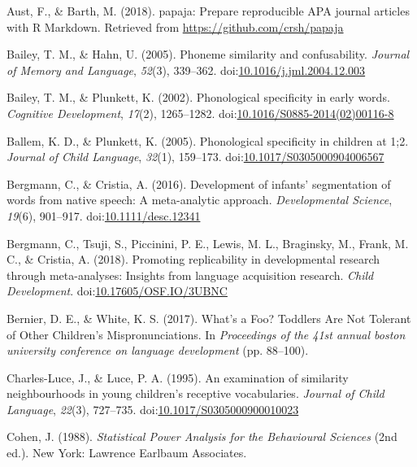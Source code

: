 \documentclass[man, noextraspace]{apa6}
\begin{document}
\leavevmode\hypertarget{ref-papaja}{}%
Aust, F., \& Barth, M. (2018). papaja: Prepare reproducible APA journal articles with R Markdown. Retrieved from \url{https://github.com/crsh/papaja}

\leavevmode\hypertarget{ref-Bailey2005}{}%
Bailey, T. M., \& Hahn, U. (2005). Phoneme similarity and confusability. \emph{Journal of Memory and Language}, \emph{52}(3), 339--362. doi:\href{https://doi.org/10.1016/j.jml.2004.12.003}{10.1016/j.jml.2004.12.003}

\leavevmode\hypertarget{ref-Bailey2002}{}%
Bailey, T. M., \& Plunkett, K. (2002). Phonological specificity in early words. \emph{Cognitive Development}, \emph{17}(2), 1265--1282. doi:\href{https://doi.org/10.1016/S0885-2014(02)00116-8}{10.1016/S0885-2014(02)00116-8}

\leavevmode\hypertarget{ref-Ballem2005}{}%
Ballem, K. D., \& Plunkett, K. (2005). Phonological specificity in children at 1;2. \emph{Journal of Child Language}, \emph{32}(1), 159--173. doi:\href{https://doi.org/10.1017/S0305000904006567}{10.1017/S0305000904006567}

\leavevmode\hypertarget{ref-Bergmann2016}{}%
Bergmann, C., \& Cristia, A. (2016). Development of infants' segmentation of words from native speech: A meta-analytic approach. \emph{Developmental Science}, \emph{19}(6), 901--917. doi:\href{https://doi.org/10.1111/desc.12341}{10.1111/desc.12341}

\leavevmode\hypertarget{ref-Bergmann2018}{}%
Bergmann, C., Tsuji, S., Piccinini, P. E., Lewis, M. L., Braginsky, M., Frank, M. C., \& Cristia, A. (2018). Promoting replicability in developmental research through meta-analyses: Insights from language acquisition research. \emph{Child Development}. doi:\href{https://doi.org/10.17605/OSF.IO/3UBNC}{10.17605/OSF.IO/3UBNC}

\leavevmode\hypertarget{ref-Bernier2017}{}%
Bernier, D. E., \& White, K. S. (2017). What's a Foo? Toddlers Are Not Tolerant of Other Children's Mispronunciations. In \emph{Proceedings of the 41st annual boston university conference on language development} (pp. 88--100).

\leavevmode\hypertarget{ref-CharlesLuce1995}{}%
Charles-Luce, J., \& Luce, P. A. (1995). An examination of similarity neighbourhoods in young children's receptive vocabularies. \emph{Journal of Child Language}, \emph{22}(3), 727--735. doi:\href{https://doi.org/10.1017/S0305000900010023}{10.1017/S0305000900010023}

\leavevmode\hypertarget{ref-cohen}{}%
Cohen, J. (1988). \emph{Statistical Power Analysis for the Behavioural Sciences} (2nd ed.). New York: Lawrence Earlbaum Associates.
\end{document}
